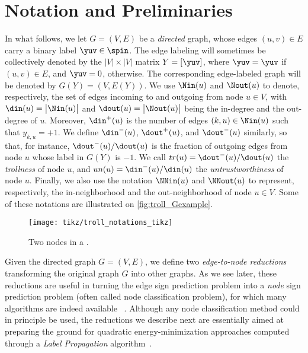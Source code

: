 \section{Notation and Preliminaries}\label{s:prel}

In what follows, we let $G=(V,E)$ be a \emph{directed} graph, whose edges $(u,v) \in E$ carry a
binary label $\yuv\in \spin$. The edge labeling will sometimes be collectively denoted by the
$|V|\times |V|$ matrix $Y = [\yuv]$, where $\yuv = \yuv$ if $(u,v) \in E$, and $\yuv = 0$,
otherwise. The corresponding edge-labeled graph will be denoted by $G(Y) = (V,E(Y))$. We use
$\Nin(u)$ and $\Nout(u)$ to denote, respectively, the set of edges incoming to and outgoing from
node $u \in V$, with $\din(u) = \big|\Nin(u)\big|$ and $\dout(u) = \big|\Nout(u)\big|$ being the
in-degree and the out-degree of $u$. Moreover, $\din^+(u)$ is the number of edges $(k,u)\in\Nin(u)$
such that $y_{k,u} = +1$. We define $\din^-(u)$, $\dout^+(u)$, and $\dout^-(u)$ similarly, so that,
for instance, $\dout^-(u)/\dout(u)$ is the fraction of outgoing edges from node $u$ whose label in
$G(Y)$ is $-1$. We call $tr(u) = \dout^-(u)/\dout(u)$ the \emph{trollness} of node $u$, and $un(u)
= \din^-(u)/\din(u)$ the \emph{untrustworthiness} of node $u$. Finally, we also use the notation
$\NNin(u)$ and $\NNout(u)$ to represent, respectively, the in-neighborhood and the out-neighborhood
of node $u \in V$. Some of these notations are illustrated on \autoref{fig:troll_Gexample}.
\begin{figure}[htpb]
  \centering
  \texttt{[image: tikz/troll\_notations\_tikz]}
  \caption{Two nodes in a \dssn{}. \label{fig:troll_Gexample}}
\end{figure}

Given the directed graph $G = (V,E)$, we define two \emph{edge-to-node reductions} transforming the
original graph $G$ into other graphs. As we see later, these reductions are useful in turning the
edge sign prediction problem into a \emph{node} sign prediction problem (often called node
classification problem), for which many algorithms are indeed available~%
\autocites{BC01}{LabelPropa03}{BDL06}{HP07}{HLP09}{Vitale2012}{HPV12}{WTA13}{HPG15}.  Although any
node classification method could in principle be used, the reductions we describe next are
essentially aimed at preparing the ground for quadratic energy-minimization approaches computed
through a \emph{Label Propagation} algorithm~\autocites{LabelPropa03}{BDL06}.

